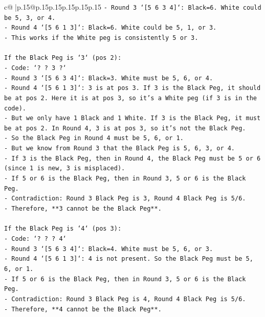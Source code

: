 \documentclass{article}
\begin{document}
{\begin{supertabular}{c@{$\;$}|p{.15\linewidth}@{}p{.15\linewidth}p{.15\linewidth}p{.15\linewidth}p{.15\linewidth}p{.15\linewidth}}
{{{\texttt{{-} Round 3 `{[}5 6 3 4{]}`: Black=6. White could be 5, 3, or 4.} \\
\texttt{{-} Round 4 `{[}5 6 1 3{]}`: Black=6. White could be 5, 1, or 3.} \\
\texttt{{-} This works if the White peg is consistently 5 or 3.} \\
\\ 
\texttt{If the Black Peg is `3` (pos 2):} \\
\texttt{{-} Code: `? ? 3 ?`} \\
\texttt{{-} Round 3 `{[}5 6 3 4{]}`: Black=3. White must be 5, 6, or 4.} \\
\texttt{{-} Round 4 `{[}5 6 1 3{]}`: 3 is at pos 3. If 3 is the Black Peg, it should be at pos 2. Here it is at pos 3, so it's a White peg (if 3 is in the code).} \\
\texttt{{-} But we only have 1 Black and 1 White. If 3 is the Black Peg, it must be at pos 2. In Round 4, 3 is at pos 3, so it's not the Black Peg.} \\
\texttt{{-} So the Black Peg in Round 4 must be 5, 6, or 1.} \\
\texttt{{-} But we know from Round 3 that the Black Peg is 5, 6, 3, or 4.} \\
\texttt{{-} If 3 is the Black Peg, then in Round 4, the Black Peg must be 5 or 6 (since 1 is new, 3 is misplaced).} \\
\texttt{{-} If 5 or 6 is the Black Peg, then in Round 3, 5 or 6 is the Black Peg.} \\
\texttt{{-} Contradiction: Round 3 Black Peg is 3, Round 4 Black Peg is 5/6.} \\
\texttt{{-} Therefore, **3 cannot be the Black Peg**.} \\
\\ 
\texttt{If the Black Peg is `4` (pos 3):} \\
\texttt{{-} Code: `? ? ? 4`} \\
\texttt{{-} Round 3 `{[}5 6 3 4{]}`: Black=4. White must be 5, 6, or 3.} \\
\texttt{{-} Round 4 `{[}5 6 1 3{]}`: 4 is not present. So the Black Peg must be 5, 6, or 1.} \\
\texttt{{-} If 5 or 6 is the Black Peg, then in Round 3, 5 or 6 is the Black Peg.} \\
\texttt{{-} Contradiction: Round 3 Black Peg is 4, Round 4 Black Peg is 5/6.} \\
\texttt{{-} Therefore, **4 cannot be the Black Peg**.} \\
\\ 
}}}
\end{supertabular}}
\end{document}
